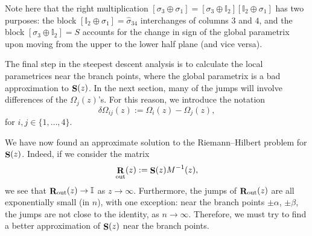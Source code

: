 \documentclass[10pt,a4paper]{amsart}
\DeclareMathOperator{\boldS}{{\bf S}}
\DeclareMathOperator{\boldR}{{\bf R}}
\numberwithin{equation}{section}
\begin{document}
\begin{Remark}
 Note here that the right multiplication $[\sigma_3 \oplus \sigma_1] = [\sigma_3\oplus \mathbb{I}_2][\mathbb{I}_2\oplus \sigma_1]$ has two purposes: the
block $[\mathbb{I}_2\oplus \sigma_1] = \hat{\sigma}_{34}$ interchanges of columns $3$ and $4$, and the block $[\sigma_3\oplus \mathbb{I}_2] = S$ accounts
for the change in sign of the global parametrix upon moving from the upper to the lower half plane (and vice versa).
\end{Remark}

\begin{Remark}
 The final step in the steepest descent analysis is to calculate the local parametrices near the branch points, where the global parametrix is a bad approximation to $\boldS(z)$. In the next section, many of the jumps will involve differences of the $\Omega_j(z)$'s. For this reason, we introduce the notation
 \begin{equation*}
 \delta \Omega_{ij}(z) := \Omega_i(z) - \Omega_j(z),
 \end{equation*}
 for $i,j\in \{1,\dots,4\}$.
\end{Remark}

We have now found an approximate solution to the Riemann--Hilbert problem for $\boldS(z)$. Indeed, if we consider the matrix
 \begin{equation*}
 \boldR_{\rm out}(z) := \boldS(z)M^{-1}(z),
 \end{equation*}
we see that $\boldR_{\rm out}(z) \to \mathbb{I}$ as $z\to \infty$. Furthermore, the jumps of $\boldR_{\rm out}(z)$ are all exponentially small (in $n$), with one exception: near the branch points $\pm \alpha$, $\pm \beta$, the jumps are not close to the identity, as $n\to \infty$. Therefore, we must try to find a better approximation of $\boldS(z)$ near the branch points.
\end{document}

